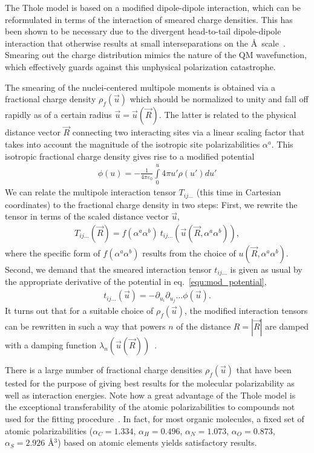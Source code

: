 The Thole model is based on a modified dipole-dipole interaction, which can be reformulated in terms of the interaction of smeared charge densities. This has been shown to be necessary due to the divergent head-to-tail dipole-dipole interaction that otherwise results at small interseparations on the \AA~scale~\cite{applequist_atom_1972, thole_molecular_1981, van_duijnen_molecular_1998}. Smearing out the charge distribution mimics the nature of the QM wavefunction, which effectively guards against this unphysical polarization catastrophe. 

The smearing of the nuclei-centered multipole moments is obtained via a fractional charge density $\rho_f(\vec{u})$ which should be normalized to unity and fall off rapidly as of a certain radius $\vec{u} = \vec{u}(\vec{R})$. The latter is related to the physical distance vector $\vec{R}$ connecting two interacting sites via a linear scaling factor that takes into account the magnitude of the isotropic site polarizabilities $\alpha^a$. This isotropic fractional charge density gives rise to a modified potential
\begin{align}
 \phi(u) = -\frac{1}{4\pi\varepsilon_0} \int \limits_{0}^{u} \! 4\pi u' \rho(u') d\!u' 
 \label{equ:mod_potential}
\end{align}
We can relate the multipole interaction tensor $T_{ij \dots}$ (this time in Cartesian coordinates) to the fractional charge density in two steps: First, we rewrite the tensor in terms of the scaled distance vector $\vec{u}$,
\begin{align}
 T_{ij \dots }(\vec{R}) = f(\alpha^a \alpha^b) \ t_{ij \dots}(\vec{u}(\vec{R},\alpha^a \alpha^b)),
\end{align}
where the specific form of $f(\alpha^a \alpha^b)$ results from the choice of $u(\vec{R},\alpha^a \alpha^b)$. Second, we demand that the smeared interaction tensor $t_{ij \dots}$ is given as usual by the appropriate derivative of the potential in eq.~\ref{equ:mod_potential},
\begin{align}
 t_{ij \dots}(\vec{u}) = - \partial_{u_i} \partial_{u_j} \dots \phi(\vec{u}).
\end{align}
It turns out that for a suitable choice of $\rho_f(\vec{u})$, the modified interaction tensors can be rewritten in such a way that powers $n$ of the distance $R = |\vec{R}|$ are damped with a damping function $\lambda_n(\vec{u}(\vec{R}))$~\cite{ren_polarizable_2003}. 

There is a large number of fractional charge densities $\rho_f(\vec{u})$ that have been tested for the purpose of giving best results for the molecular polarizability as well as interaction energies. Note how a great advantage of the Thole model is the exceptional transferability of the atomic polarizabilities to compounds not used for the fitting procedure~\cite{van_duijnen_molecular_1998}. In fact, for most organic molecules, a fixed set of atomic polarizabilities ($\alpha_C = 1.334$, $\alpha_H = 0.496$, $\alpha_N = 1.073$, $\alpha_O = 0.873$, $\alpha_S = 2.926$ \AA$^3$) based on atomic elements yields satisfactory results.

